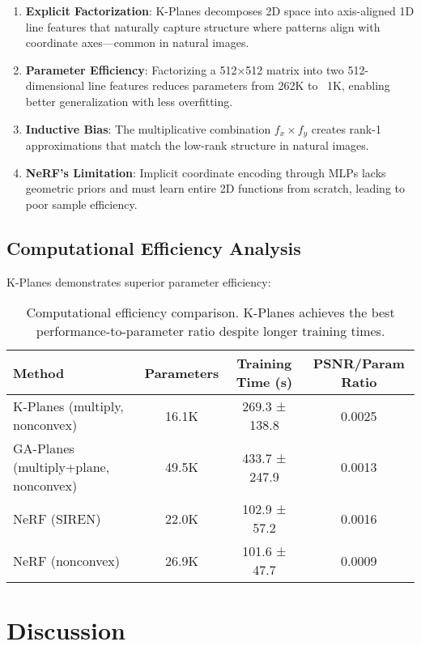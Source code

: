\documentclass[10pt,twocolumn,letterpaper]{article}
\begin{document}
\begin{enumerate}
\item \textbf{Explicit Factorization}: K-Planes decomposes 2D space into axis-aligned 1D line features that naturally capture structure where patterns align with coordinate axes—common in natural images.

\item \textbf{Parameter Efficiency}: Factorizing a 512×512 matrix into two 512-dimensional line features reduces parameters from 262K to ~1K, enabling better generalization with less overfitting.

\item \textbf{Inductive Bias}: The multiplicative combination $f_x \times f_y$ creates rank-1 approximations that match the low-rank structure in natural images.

\item \textbf{NeRF's Limitation}: Implicit coordinate encoding through MLPs lacks geometric priors and must learn entire 2D functions from scratch, leading to poor sample efficiency.
\end{enumerate}

\subsection{Computational Efficiency Analysis}

K-Planes demonstrates superior parameter efficiency:

\begin{table}[t]
\centering
\small
\begin{tabular}{@{}lccc@{}}
\toprule
\textbf{Method} & \textbf{Parameters} & \textbf{Training Time (s)} & \textbf{PSNR/Param Ratio} \\
\midrule
K-Planes (multiply, nonconvex) & 16.1K & 269.3 ± 138.8 & 0.0025 \\
GA-Planes (multiply+plane, nonconvex) & 49.5K & 433.7 ± 247.9 & 0.0013 \\
NeRF (SIREN) & 22.0K & 102.9 ± 57.2 & 0.0016 \\
NeRF (nonconvex) & 26.9K & 101.6 ± 47.7 & 0.0009 \\
\bottomrule
\end{tabular}
\caption{Computational efficiency comparison. K-Planes achieves the best performance-to-parameter ratio despite longer training times.}
\label{tab:efficiency}
\end{table}

\section{Discussion}
\end{document}
